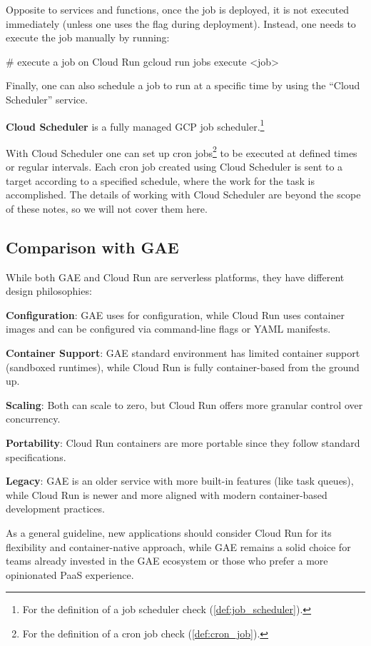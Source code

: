 Opposite to services and functions, once the job is deployed, it is not executed immediately (unless one uses the
 flag during deployment). Instead, one needs to execute the job manually by running:
\begin{bash}
# execute a job on Cloud Run
gcloud run jobs execute <job>
\end{bash}

Finally, one can also schedule a job to run at a specific time by using the ``Cloud Scheduler'' service.

\textbf{Cloud Scheduler} is a fully managed GCP job scheduler.\footnote{For the definition of a job scheduler check
(\ref{def:job_scheduler}).}
\ed

With Cloud Scheduler one can set up cron jobs\footnote{For the definition of a cron job check (\ref{def:cron_job}).} to
be executed at defined times or regular intervals. Each cron job created using Cloud Scheduler is sent to a target
according to a specified schedule, where the work for the task is accomplished. The details of working with Cloud
Scheduler are beyond the scope of these notes, so we will not cover them here.

\subsection{Comparison with GAE}

While both GAE and Cloud Run are serverless platforms, they have different design philosophies:
\bit
\item \textbf{Configuration}: GAE uses  for configuration, while Cloud Run uses container images
and can be configured via command-line flags or YAML manifests.
\item \textbf{Container Support}: GAE standard environment has limited container support (sandboxed runtimes), while
Cloud Run is fully container-based from the ground up.
\item \textbf{Scaling}: Both can scale to zero, but Cloud Run offers more granular control over concurrency.
\item \textbf{Portability}: Cloud Run containers are more portable since they follow standard specifications.
\item \textbf{Legacy}: GAE is an older service with more built-in features (like task queues), while Cloud Run is
newer and more aligned with modern container-based development practices.
\eit

As a general guideline, new applications should consider Cloud Run for its flexibility and container-native approach,
while GAE remains a solid choice for teams already invested in the GAE ecosystem or those who prefer a more opinionated
PaaS experience.


